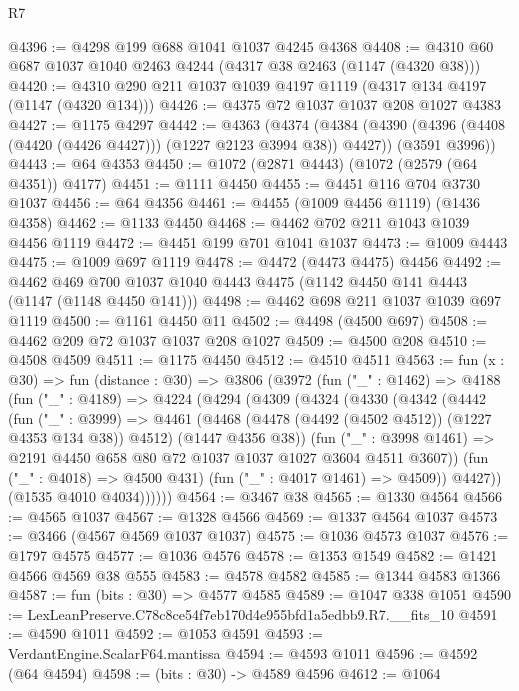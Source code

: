 \begin{lexlean}{R7}
\begin{coremodule}
@4396 := @4298 @199 @688 @1041 @1037 @4245 @4368
@4408 := @4310 @60 @687 @1037 @1040 @2463 @4244 (@4317 @38 @2463 (@1147 (@4320 @38)))
@4420 := @4310 @290 @211 @1037 @1039 @4197 @1119 (@4317 @134 @4197 (@1147 (@4320 @134)))
@4426 := @4375 @72 @1037 @1037 @208 @1027 @4383
@4427 := @1175 @4297
@4442 := @4363
    (@4374
      (@4384 (@4390 (@4396 (@4408 (@4420 (@4426 @4427))) (@1227 @2123 @3994 @38)) @4427))
      (@3591 @3996))
@4443 := @64 @4353
@4450 := @1072 (@2871 @4443) (@1072 (@2579 (@64 @4351)) @4177)
@4451 := @1111 @4450
@4455 := @4451 @116 @704 @3730 @1037
@4456 := @64 @4356
@4461 := @4455 (@1009 @4456 @1119) (@1436 @4358)
@4462 := @1133 @4450
@4468 := @4462 @702 @211 @1043 @1039 @4456 @1119
@4472 := @4451 @199 @701 @1041 @1037
@4473 := @1009 @4443
@4475 := @1009 @697 @1119
@4478 := @4472 (@4473 @4475) @4456
@4492 := @4462 @469 @700 @1037 @1040 @4443 @4475 (@1142 @4450 @141 @4443 (@1147 (@1148 @4450 @141)))
@4498 := @4462 @698 @211 @1037 @1039 @697 @1119
@4500 := @1161 @4450 @11
@4502 := @4498 (@4500 @697)
@4508 := @4462 @209 @72 @1037 @1037 @208 @1027
@4509 := @4500 @208
@4510 := @4508 @4509
@4511 := @1175 @4450
@4512 := @4510 @4511
@4563 := fun (x : @30) =>
  fun (distance : @30) =>
  @3806
    (@3972
      (fun ("_" : @1462) =>
      @4188
        (fun ("_" : @4189) =>
        @4224
          (@4294
            (@4309
              (@4324
                (@4330
                  (@4342
                    (@4442
                      (fun ("_" : @3999) =>
                      @4461
                        (@4468 (@4478 (@4492 (@4502 @4512)) (@1227 @4353 @134 @38)) @4512)
                        (@1447 @4356 @38))
                      (fun ("_" : @3998 @1461) =>
                      @2191 @4450 @658 @80 @72 @1037 @1037 @1027 @3604 @4511 @3607))
                    (fun ("_" : @4018) => @4500 @431)
                    (fun ("_" : @4017 @1461) => @4509))
                  @4427))
              (@1535 @4010 @4034))))))
@4564 := @3467 @38
@4565 := @1330 @4564
@4566 := @4565 @1037
@4567 := @1328 @4566
@4569 := @1337 @4564 @1037
@4573 := @3466 (@4567 @4569 @1037 @1037)
@4575 := @1036 @4573 @1037
@4576 := @1797 @4575
@4577 := @1036 @4576
@4578 := @1353 @1549
@4582 := @1421 @4566 @4569 @38 @555
@4583 := @4578 @4582
@4585 := @1344 @4583 @1366
@4587 := fun (bits : @30) => @4577 @4585
@4589 := @1047 @338 @1051
@4590 := LexLeanPreserve.C78c8ce54f7eb170d4e955bfd1a5edbb9.R7.__fits_10
@4591 := @4590 @1011
@4592 := @1053 @4591
@4593 := VerdantEngine.ScalarF64.mantissa
@4594 := @4593 @1011
@4596 := @4592 (@64 @4594)
@4598 := (bits : @30) -> @4589 @4596
@4612 := @1064

\end{coremodule}
\end{lexlean}
